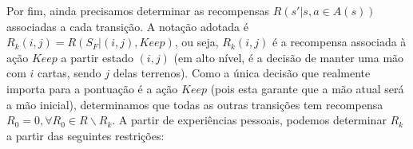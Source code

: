 \documentclass{book}
\begin{document}
%
Por fim, ainda precisamos determinar as recompensas $R\left(s' | s, a \in A(s) \right)$ associadas a cada transição. A notação adotada é $R_k(i, j) = R(S_F | (i, j), Keep)$, ou seja, $R_k(i, j)$ é a recompensa associada à ação $Keep$ a partir estado $(i, j)$ (em alto nível, é a decisão de manter uma mão com $i$ cartas, sendo $j$ delas terrenos). Como a única decisão que realmente importa para a pontuação é a ação $Keep$ (pois esta garante que a mão atual será a mão inicial), determinamos que todas as outras transições tem recompensa $R_0 = 0, \forall R_0 \in R \backslash R_k$. A partir de experiências pessoais, podemos determinar $R_k$ a partir das seguintes restrições:
\end{document}
